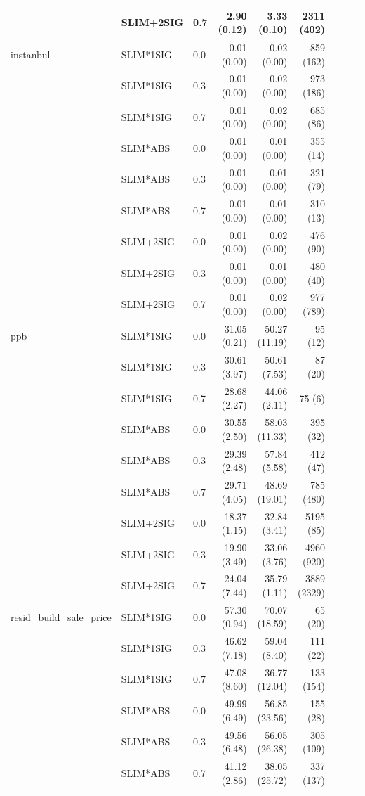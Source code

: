 \begin{longtable}{lllrrrrrr}
 & SLIM+2SIG & 0.7 & 2.90 (0.12) & 3.33 (0.10) & 2311 (402) \\
\midrule
instanbul & SLIM*1SIG & 0.0 & 0.01 (0.00) & 0.02 (0.00) & 859 (162) \\
 & SLIM*1SIG & 0.3 & 0.01 (0.00) & 0.02 (0.00) & 973 (186) \\
 & SLIM*1SIG & 0.7 & 0.01 (0.00) & 0.02 (0.00) & 685 (86) \\
 & SLIM*ABS & 0.0 & 0.01 (0.00) & 0.01 (0.00) & 355 (14) \\
 & SLIM*ABS & 0.3 & 0.01 (0.00) & 0.01 (0.00) & 321 (79) \\
 & SLIM*ABS & 0.7 & 0.01 (0.00) & 0.01 (0.00) & 310 (13) \\
 & SLIM+2SIG & 0.0 & 0.01 (0.00) & 0.02 (0.00) & 476 (90) \\
 & SLIM+2SIG & 0.3 & 0.01 (0.00) & 0.01 (0.00) & 480 (40) \\
 & SLIM+2SIG & 0.7 & 0.01 (0.00) & 0.02 (0.00) & 977 (789) \\
\midrule
ppb & SLIM*1SIG & 0.0 & 31.05 (0.21) & 50.27 (11.19) & 95 (12) \\
 & SLIM*1SIG & 0.3 & 30.61 (3.97) & 50.61 (7.53) & 87 (20) \\
 & SLIM*1SIG & 0.7 & 28.68 (2.27) & 44.06 (2.11) & 75 (6) \\
 & SLIM*ABS & 0.0 & 30.55 (2.50) & 58.03 (11.33) & 395 (32) \\
 & SLIM*ABS & 0.3 & 29.39 (2.48) & 57.84 (5.58) & 412 (47) \\
 & SLIM*ABS & 0.7 & 29.71 (4.05) & 48.69 (19.01) & 785 (480) \\
 & SLIM+2SIG & 0.0 & 18.37 (1.15) & 32.84 (3.41) & 5195 (85) \\
 & SLIM+2SIG & 0.3 & 19.90 (3.49) & 33.06 (3.76) & 4960 (920) \\
 & SLIM+2SIG & 0.7 & 24.04 (7.44) & 35.79 (1.11) & 3889 (2329) \\
\midrule
resid_build_sale_price & SLIM*1SIG & 0.0 & 57.30 (0.94) & 70.07 (18.59) & 65 (20) \\
 & SLIM*1SIG & 0.3 & 46.62 (7.18) & 59.04 (8.40) & 111 (22) \\
 & SLIM*1SIG & 0.7 & 47.08 (8.60) & 36.77 (12.04) & 133 (154) \\
 & SLIM*ABS & 0.0 & 49.99 (6.49) & 56.85 (23.56) & 155 (28) \\
 & SLIM*ABS & 0.3 & 49.56 (6.48) & 56.05 (26.38) & 305 (109) \\
 & SLIM*ABS & 0.7 & 41.12 (2.86) & 38.05 (25.72) & 337 (137) \\

\end{longtable}
